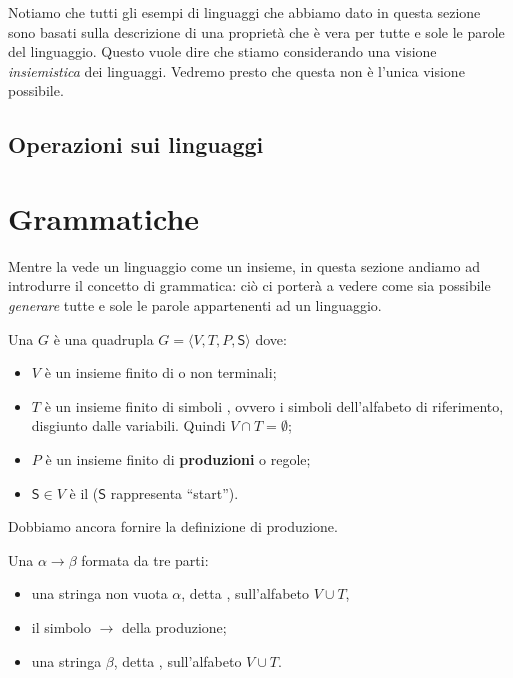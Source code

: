 Notiamo che tutti gli esempi di linguaggi che abbiamo dato in questa sezione sono basati sulla descrizione di una
proprietà che è vera per tutte e sole le parole del linguaggio.
Questo vuole dire che stiamo considerando una visione \emph{insiemistica} dei linguaggi.
Vedremo presto che questa non è l'unica visione possibile.


\subsection{Operazioni sui linguaggi}\label{sec:operazioni-linguaggi}


\section{Grammatiche}\label{sec:grammatiche}

Mentre la  vede un linguaggio come un insieme, in questa sezione andiamo ad introdurre il concetto
di grammatica: ciò ci porterà a vedere come sia possibile \emph{generare} tutte e sole le parole appartenenti ad un linguaggio.


\begin{definition}[Grammatica]\label{def:grammatica}
	Una  $G$ è una quadrupla $G=\langle V, T, P, \mathsf{S} \rangle$ dove:
	\begin{itemize}
		\item $V$ è un insieme finito di  o non terminali;
		\item $T$ è un insieme finito di simboli , ovvero i simboli dell'alfabeto di riferimento,
		      disgiunto dalle variabili.
		      Quindi $V \cap T=\emptyset$;
		\item $P$ è un insieme finito di \textbf{produzioni} o regole;
		\item $\mathsf{S}\in V$ è il  ($\mathsf{S}$ rappresenta ``start'').
	\end{itemize}
\end{definition}


Dobbiamo ancora fornire la definizione di produzione.

\begin{definition}\label{def:produzione}
	Una  $\alpha \to \beta$ formata da tre parti:
	\begin{itemize}
		\item una stringa non vuota $\alpha$, detta ,  sull'alfabeto $V \cup T$,
		\item il simbolo $\to$ della produzione;
		\item una stringa $\beta$, detta ,  sull'alfabeto $V \cup T$.
	\end{itemize}
\end{definition}

